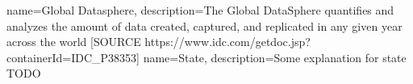  {
   name=Global Datasphere,
   description={The Global DataSphere quantifies and analyzes the amount of data created, captured, and replicated in any given year across the world [SOURCE https://www.idc.com/getdoc.jsp?containerId=IDC_P38353]}
}
 {
   name=State,
   description={Some explanation for state TODO}
}
